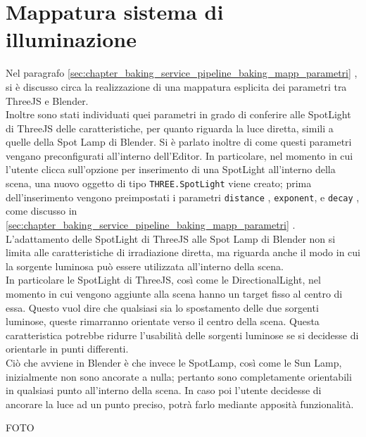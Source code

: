 \section{Mappatura sistema di illuminazione}
\label{sec:chapter_creazione_scena_mapping_illuminazione}
Nel paragrafo \ref{sec:chapter_baking_service_pipeline_baking_mapp_parametri} , si è discusso circa la realizzazione di una mappatura esplicita dei parametri tra ThreeJS e Blender. 
\\
Inoltre sono stati individuati quei parametri in grado di conferire alle SpotLight di ThreeJS delle caratteristiche, per quanto riguarda la luce diretta, simili a quelle della Spot Lamp di Blender. Si è parlato inoltre di come questi parametri vengano preconfigurati all’interno dell’Editor. In particolare, nel momento in cui l’utente clicca sull’opzione per inserimento di una SpotLight all’interno della scena, una nuovo oggetto di tipo \texttt{THREE.SpotLight} viene creato; prima dell’inserimento vengono preimpostati i parametri \texttt{distance} , \texttt{exponent}, e \texttt{decay} , come discusso in \ref{sec:chapter_baking_service_pipeline_baking_mapp_parametri} .
\\ 
L’adattamento delle SpotLight di ThreeJS alle Spot Lamp di Blender non si limita alle caratteristiche di irradiazione diretta, ma riguarda anche il modo in cui la sorgente luminosa può essere utilizzata all’interno della scena. 
\\
In particolare le SpotLight di ThreeJS, così come le DirectionalLight, nel momento in cui vengono aggiunte alla scena hanno un target fisso al centro di essa. Questo vuol dire che qualsiasi sia lo spostamento delle due sorgenti luminose, queste rimarranno orientate verso il centro della scena. Questa caratteristica potrebbe ridurre l’usabilità delle sorgenti luminose se si decidesse di orientarle in punti differenti.
\\ 
Ciò che avviene in Blender è che invece le SpotLamp, così come le Sun Lamp, inizialmente non sono ancorate a nulla; pertanto sono completamente orientabili in qualsiasi punto all’interno della scena. In caso poi l’utente decidesse di ancorare la luce ad un punto preciso, potrà farlo mediante apposità funzionalità.


FOTO

